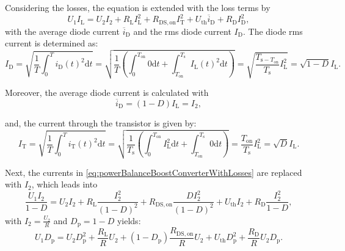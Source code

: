 \begin{solutionblock}
    Considering the losses, the equation is extended with the loss terms by
    \begin{equation}
        U_1 I_{\mathrm{L}} = U_2 I_2 + R_{\mathrm{L}} I_{\mathrm{L}}^2 + R_{\mathrm{DS,on}} I_{\mathrm{T}}^2 + U_{\mathrm{th}} \overline{i}_{\mathrm{D}} + R_{\mathrm{D}} I_{\mathrm{D}}^2,
        \label{eq:powerBalanceBoostConverterWithLosses}
    \end{equation}
    with the average diode current $\overline{i}_{\mathrm{D}}$ and the rms diode current $I_{\mathrm{D}}$. The diode rms current is determined as:
    \begin{equation}
        I_{\mathrm{D}} = \sqrt{\frac{1}{T} \int_{0}^{T} i_{\mathrm{D}}(t)^2 \mathrm{d}t}
        = \sqrt{\frac{1}{T} \left( \int_{0}^{T_{\mathrm{on}}} 0 \mathrm{d}t + \int_{T_{\mathrm{on}}}^{T_{\mathrm{s}}} I_{\mathrm{L}}(t)^2 \mathrm{d}t \right)}
        = \sqrt{\frac{T_{\mathrm{s}-T_{\mathrm{on}}}}{T_{\mathrm{s}}}I_{\mathrm{L}}^2}
        = \sqrt{1-D}I_{\mathrm{L}}.
    \end{equation}
    
    Moreover, the average diode current is calculated with
    \begin{equation}
        \overline{i}_{\mathrm{D}} = (1-D)I_{\mathrm{L}} = I_2,
        \label{eq:avgCurrentDiode}
    \end{equation}

    and, the current through the transistor is given by:
    \begin{equation}
        I_{\mathrm{T}} = \sqrt{\frac{1}{T} \int_{0}^{T} i_{\mathrm{T}}(t)^2 \mathrm{d}t}
        = \sqrt{\frac{1}{T_{\mathrm{s}}}\left(\int_{0}^{T_{\mathrm{on}}} I_{\mathrm{L}}^2 \mathrm{d} t + \int_{T_{\mathrm{on}}}^{T_{\mathrm{s}}} 0 \mathrm{d} t \right)}
        = \frac{T_{\mathrm{on}}}{T_{\mathrm{s}}}I_{\mathrm{L}}^2
        = \sqrt{D} I_{\mathrm{L}}.
    \end{equation}

    Next, the currents in \eqref{eq:powerBalanceBoostConverterWithLosses} are replaced with $I_{\mathrm{2}}$, which leads into
    \begin{equation}
        \frac{U_1 I_2}{1 -D} = U_2 I_2 + R_{\mathrm{L}}\frac{I_2^2}{\left(1-D\right)^2} + R_{\mathrm{DS,on}} \frac{D I_2^2}{\left(1-D\right)^2} + U_{\mathrm{th}}I_2 + R_{\mathrm{D}}\frac{I_2^2}{1-D},
    \end{equation}
    with $I_2 = \frac{U_2}{R}$ and $D_{\mathrm{p}} = 1-D$ yields:
    \begin{equation}
        U_1 D_{\mathrm{p}} = U_2 D_{\mathrm{p}}^2 + \frac{R_{\mathrm{L}}}{R} U_2 + (1-D_{\mathrm{p}}) \frac{R_{\mathrm{DS,on}}}{R}U_2 + U_{\mathrm{th}}D_{\mathrm{p}}^2 + \frac{R_{\mathrm{D}}}{R}U_2 D_{\mathrm{p}}.
    \end{equation}


\end{solutionblock}
